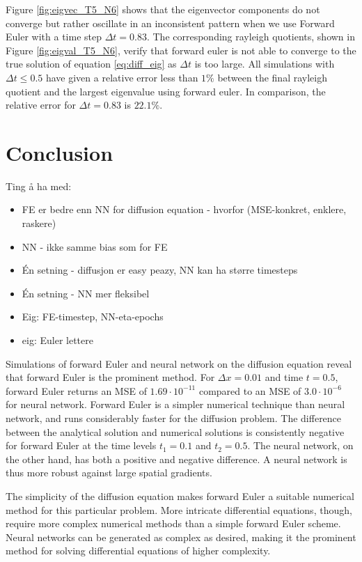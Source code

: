 \documentclass[12pt]{extarticle}
\begin{document}
Figure \ref{fig:eigvec_T5_N6} shows that the eigenvector components do not converge but rather oscillate in an inconsistent pattern when we use Forward Euler with a time step $\Delta t =0.83$. The corresponding rayleigh quotients, shown in Figure \ref{fig:eigval_T5_N6}, verify that forward euler is not able to converge to the true solution of equation \eqref{eq:diff_eig} as $\Delta t$ is too large. All simulations with $\Delta t \leq 0.5$ have given a relative error less than $1\%$ between the final rayleigh quotient and the largest eigenvalue using forward euler. In comparison, the relative error for $\Delta t = 0.83$ is $22.1\%$.


\section{Conclusion}
Ting å ha med:
\begin{itemize}
	\item FE er bedre enn NN for diffusion equation - hvorfor (MSE-konkret, enklere, raskere)
	\item NN - ikke samme bias som for FE 
	\item Én setning - diffusjon er easy peazy, NN kan ha større timesteps 
	\item Én setning - NN mer fleksibel 
	\item Eig: FE-timestep, NN-eta-epochs 
	\item eig: Euler lettere 
\end{itemize}

Simulations of forward Euler and neural network on the diffusion equation reveal that forward Euler is the prominent method. For $\Delta x = 0.01$ and time $t=0.5$, forward Euler returns an MSE of $1.69 \cdot 10^{-11}$ compared to an MSE of $3.0\cdot 10^{-6}$ for neural network. Forward Euler is a simpler numerical technique than neural network, and runs considerably faster for the diffusion problem. The difference between the analytical solution and numerical solutions is consistently negative for forward Euler at the time levels $t_1 = 0.1$ and $t_2=0.5$. The neural network, on the other hand, has both a positive and negative difference. A neural network is thus more robust against large spatial gradients. 

The simplicity of the diffusion equation makes forward Euler a suitable numerical method for this particular problem. More intricate differential equations, though, require more complex numerical methods than a simple forward Euler scheme. Neural networks can be generated as complex as desired, making it the prominent method for solving differential equations of higher complexity.
\end{document}
